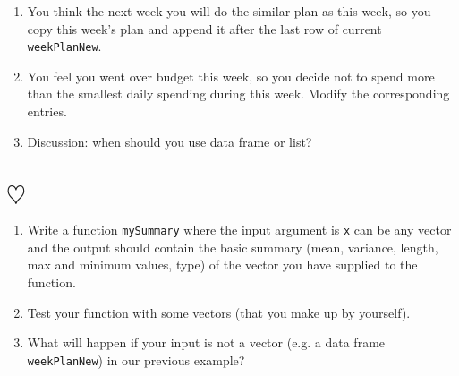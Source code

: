 \documentclass[a4paper]{article}
\begin{document}
\begin{enumerate}
\item You think the next week you will do the similar plan as this week, so you
  copy this week's plan and append it after the last row of current
  \texttt{weekPlanNew}.
\item You feel you went over budget this week, so you decide not to spend more than
  the smallest daily spending during this week. Modify the
  corresponding entries.
\item Discussion: when should you use data frame or list?
\end{enumerate}

\section{$\heartsuit$}
\begin{enumerate}
\item Write a function \texttt{mySummary} where the input argument is
  \texttt{x} can be any vector and the output should contain the basic
  summary (mean, variance, length,
  max and minimum values, type) of the vector you have
  supplied to the function.
\item Test your function with some vectors (that you make up by yourself).
\item What will happen if your input is not a vector (e.g. a data frame \texttt{weekPlanNew})
  in our previous example?
\end{enumerate}
\end{document}
